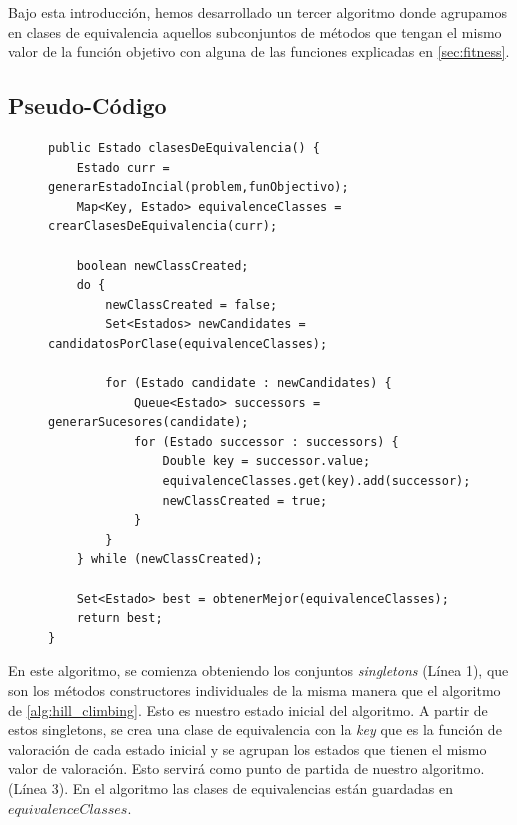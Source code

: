  Bajo esta introducción, hemos desarrollado un tercer algoritmo donde agrupamos en clases de equivalencia aquellos subconjuntos de métodos que tengan el mismo valor de la función objetivo con alguna de las funciones explicadas en \ref{sec:fitness}.

\subsection{Pseudo-Código}

\begin{figure}[H]
\begin{lstlisting}[style=javaStyle, caption={Algoritmo basado en Clases de Equivalencia}, label={algo:clases_equivalencia}]
public Estado clasesDeEquivalencia() {
    Estado curr = generarEstadoIncial(problem,funObjectivo);
    Map<Key, Estado> equivalenceClasses = crearClasesDeEquivalencia(curr);

    boolean newClassCreated;
    do {
        newClassCreated = false;
        Set<Estados> newCandidates = candidatosPorClase(equivalenceClasses);

        for (Estado candidate : newCandidates) {
            Queue<Estado> successors = generarSucesores(candidate);
            for (Estado successor : successors) {
                Double key = successor.value;
                equivalenceClasses.get(key).add(successor);
                newClassCreated = true;
            }
        }
    } while (newClassCreated);

    Set<Estado> best = obtenerMejor(equivalenceClasses);
    return best;
}
\end{lstlisting}
\end{figure}


En este algoritmo, se comienza obteniendo los conjuntos \emph{singletons} (Línea 1), que son los métodos constructores individuales de la misma manera que el algoritmo de \ref{alg:hill_climbing}. Esto es nuestro estado inicial del algoritmo. A partir de estos singletons, se crea una clase de equivalencia con la \emph{key} que es la función de valoración de cada estado inicial y se agrupan los estados que tienen el mismo valor de valoración. Esto servirá como punto de partida de nuestro algoritmo. (Línea 3).  En el algoritmo las clases de equivalencias están guardadas en $equivalenceClasses$.

